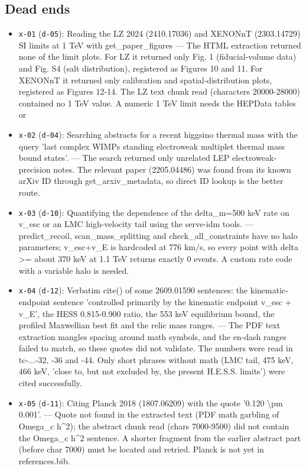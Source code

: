 \documentclass[11pt,a4paper]{article}
\begin{document}
\subsection{Dead ends}
\begin{itemize}
  \item \texttt{x-01} (\texttt{d-05}): Reading the LZ 2024 (2410.17036) and XENONnT (2303.14729) SI limits at 1 TeV with get\_paper\_figures --- The HTML extraction returned none of the limit plots. For LZ it returned only Fig. 1 (fiducial-volume data) and Fig. S4 (salt distribution), registered as Figures 10 and 11. For XENONnT it returned only calibration and spatial-distribution plots, registered as Figures 12-14. The LZ text chunk read (characters 20000-28000) contained no 1 TeV value. A numeric 1 TeV limit needs the HEPData tables or 
  \item \texttt{x-02} (\texttt{d-04}): Searching abstracts for a recent higgsino thermal mass with the query 'last complex WIMPs standing electroweak multiplet thermal mass bound states'. --- The search returned only unrelated LEP electroweak-precision notes. The relevant paper (2205.04486) was found from its known arXiv ID through get\_arxiv\_metadata, so direct ID lookup is the better route.
  \item \texttt{x-03} (\texttt{d-10}): Quantifying the dependence of the delta\_m=500 keV rate on v\_esc or an LMC high-velocity tail using the serve-idm tools. --- predict\_recoil, scan\_mass\_splitting and check\_all\_constraints have no halo parameters; v\_esc+v\_E is hardcoded at 776 km/s, so every point with delta \textgreater{}= about 370 keV at 1.1 TeV returns exactly 0 events. A custom rate code with a variable halo is needed.
  \item \texttt{x-04} (\texttt{d-12}): Verbatim cite() of some 2609.01590 sentences: the kinematic-endpoint sentence 'controlled primarily by the kinematic endpoint v\_esc + v\_E', the HESS 0.815-0.900 ratio, the 553 keV equilibrium bound, the profiled Maxwellian best fit and the relic mass ranges. --- The PDF text extraction mangles spacing around math symbols, and the en-dash ranges failed to match, so these quotes did not validate. The numbers were read in tc-...-32, -36 and -44. Only short phrases without math (LMC tail, 475 keV, 466 keV, 'close to, but not excluded by, the present H.E.S.S. limits') were cited successfully.
  \item \texttt{x-05} (\texttt{d-11}): Citing Planck 2018 (1807.06209) with the quote '0.120 \textbackslash{}pm 0.001'. --- Quote not found in the extracted text (PDF math garbling of Omega\_c h\textasciicircum{}2); the abstract chunk read (chars 7000-9500) did not contain the Omega\_c h\textasciicircum{}2 sentence. A shorter fragment from the earlier abstract part (before char 7000) must be located and retried. Planck is not yet in references.bib.

\end{itemize}
\end{document}
